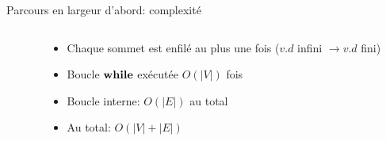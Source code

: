 \begin{frame}{Parcours en largeur d'abord: complexité}

\begin{columns}
\begin{column}{6cm}
\begin{center}
{\small\vspace{-0.3cm}
}
\end{center}
\end{column}
\begin{column}{5cm}
\begin{itemize}
\item Chaque sommet est enfilé au plus une fois
  ($v.d$ infini $\rightarrow v.d$ fini)
\item Boucle $\textbf{while}$ exécutée $O(|V|)$ fois
\item Boucle interne: $O(|E|)$ \alert{au total}
\item Au total: $O(|V|+|E|)$
\end{itemize}
\end{column}
\end{columns}

\end{frame}

